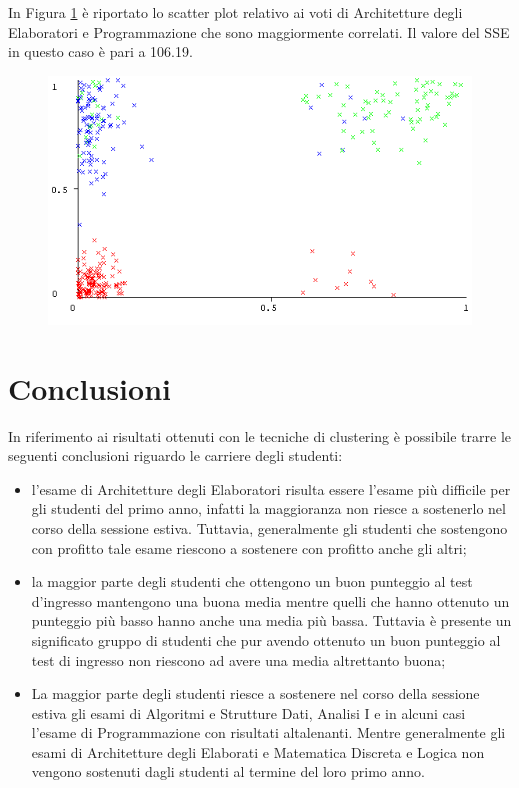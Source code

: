 \documentclass[12pt]{article}
\begin{document}
In Figura \ref{APC} è riportato lo scatter plot relativo ai voti di Architetture degli Elaboratori e Programmazione che sono
maggiormente correlati. Il valore del SSE in questo caso è pari a 106.19.
\begin{figure}[H]
	\label{APC}
	\includegraphics[width=\textwidth]{img/ARC-PRG-Cluster.png}
\end{figure}

\section{Conclusioni}
In riferimento ai risultati ottenuti con le tecniche di clustering è possibile trarre le seguenti conclusioni riguardo
le carriere degli studenti:

\begin{itemize}
\item l'esame di Architetture degli Elaboratori risulta essere l'esame più difficile per gli studenti del primo anno,
  infatti la maggioranza non riesce a sostenerlo nel corso della sessione estiva. Tuttavia, generalmente gli studenti 
  che sostengono con profitto tale esame riescono a sostenere con profitto anche gli altri; 
\item la maggior parte degli studenti che ottengono un buon punteggio al test d'ingresso mantengono una buona media
  mentre quelli che hanno ottenuto un punteggio più basso hanno anche una media più bassa. Tuttavia è presente
  un significato gruppo di studenti che pur avendo ottenuto un buon punteggio al test di ingresso non riescono
  ad avere una media altrettanto buona;
\item La maggior parte degli studenti riesce a sostenere nel corso della sessione estiva gli esami di Algoritmi e 
  Strutture Dati, Analisi I e in alcuni casi l'esame di Programmazione con risultati altalenanti. Mentre 
  generalmente gli esami di Architetture degli Elaborati e Matematica Discreta e Logica non vengono sostenuti
  dagli studenti al termine del loro primo anno.
\end{itemize}
\end{document}
